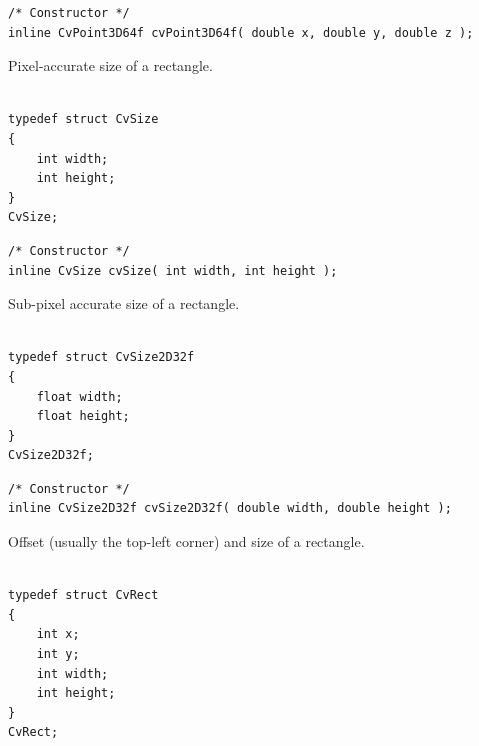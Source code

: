 \begin{lstlisting}
/* Constructor */
inline CvPoint3D64f cvPoint3D64f( double x, double y, double z );

\end{lstlisting}

\label{CvSize}

Pixel-accurate size of a rectangle.

\begin{lstlisting}

typedef struct CvSize
{
    int width; 
    int height; 
}
CvSize;
\end{lstlisting}

\begin{description}
\end{description}

\begin{lstlisting}
/* Constructor */
inline CvSize cvSize( int width, int height );

\end{lstlisting}

\label{CvSize2D32f}

Sub-pixel accurate size of a rectangle.

\begin{lstlisting}

typedef struct CvSize2D32f
{
    float width; 
    float height; 
}
CvSize2D32f;
\end{lstlisting}

\begin{description}
\end{description}

\begin{lstlisting}
/* Constructor */
inline CvSize2D32f cvSize2D32f( double width, double height );

\end{lstlisting}

\label{CvRect}

Offset (usually the top-left corner) and size of a rectangle.

\begin{lstlisting}

typedef struct CvRect
{
    int x; 
    int y; 
    int width; 
    int height; 
}
CvRect;
\end{lstlisting}

